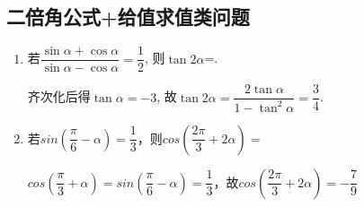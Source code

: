 \subsection*{二倍角公式+给值求值类问题}
\begin{enumerate}
    \item 若$\dfrac{\sin\alpha+\cos\alpha}{\sin\alpha-\cos\alpha}=\dfrac{1}{2}$, 则$\tan2\alpha$=. 
    \begin{jieda}
    齐次化后得$\tan\alpha=-3$, 故$\tan2\alpha=\dfrac{2\tan\alpha}{1-\tan^2\alpha}=\dfrac{3}{4}$. 
    \end{jieda}

    \item 若$sin(\dfrac{\pi}{6} - \alpha) = \dfrac{1}{3}$，则$cos(\dfrac{2\pi}{3} + 2\alpha) = $
        \begin{jieda}
            $cos(\dfrac{\pi}{3} + \alpha) = sin(\dfrac{\pi}{6} - \alpha) = \dfrac{1}{3}$，故$cos(\dfrac{2\pi}{3} + 2\alpha) = -\dfrac{7}{9}$
        \end{jieda}
\end{enumerate}

